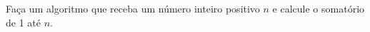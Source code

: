 
\question[10]

Faça um algoritmo que receba um número inteiro positivo $n$ e calcule o somatório de 1 até $n$.